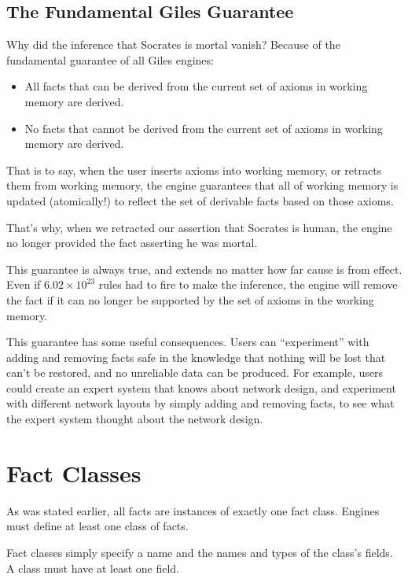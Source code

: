 \documentclass[letterpaper,10pt]{article}
\begin{document}
\subsection{The Fundamental Giles Guarantee}
\label{giles-guarantee}
Why did the inference that Socrates is mortal vanish?
Because of the fundamental guarantee of all Giles engines:
\begin{center}
  \begin{itemize}
      \item All facts that can be derived from the current set of axioms in working memory are derived.
      \item No facts that cannot be derived from the current set of axioms in working memory are derived.
  \end{itemize}
\end{center}

That is to say, when the user inserts axioms into working memory, or retracts them from working memory, the engine guarantees that all of working memory is updated (atomically!) to reflect the set of derivable facts based on those axioms.

That's why, when we retracted our assertion that Socrates is human, the engine no longer provided the fact asserting he was mortal.

This guarantee is always true, and extends no matter how far cause is from effect.
Even if $6.02 \times 10^{23}$ rules had to fire to make the inference, the engine will remove the fact if it can no longer be supported by the set of axioms in the working memory.

This guarantee has some useful consequences.
Users can ``experiment'' with adding and removing facts safe in the knowledge that nothing will be lost that can't be restored, and no unreliable data can be produced.
For example, users could create an expert system that knows about network design, and experiment with different network layouts by simply adding and removing facts, to see what the expert system thought about the network design.

\section{Fact Classes}
As was stated earlier, all facts are instances of exactly one fact class.
Engines must define at least one class of facts.

Fact classes simply specify a name and the names and types of the class's fields.
A class must have at least one field.
\end{document}
